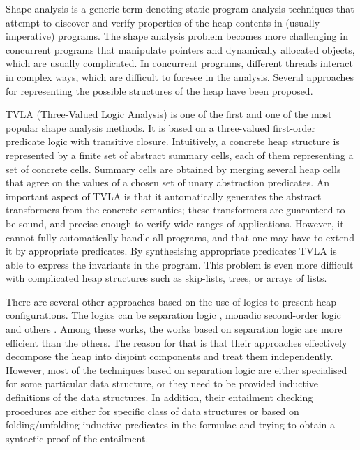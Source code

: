 Shape analysis is a generic term denoting static
program-analysis techniques that attempt to discover and verify properties of the heap contents in (usually imperative) programs. The shape analysis problem becomes more challenging in concurrent programs that manipulate pointers and dynamically allocated objects, which are usually complicated. 
In concurrent programs, different threads interact in complex ways, which are difficult to foresee in the analysis. Several approaches for representing the possible structures of the heap have been proposed.

TVLA (Three-Valued Logic Analysis) \cite{SagivRW02} is one of the first and one of the most popular shape analysis
methods. It is based on a three-valued first-order predicate logic with transitive closure. Intuitively, a concrete heap structure is represented by a finite set of abstract summary cells, each of them representing a set of concrete cells. Summary cells are obtained by merging several heap cells that agree on the values of a chosen set of unary abstraction predicates.  %
An important aspect of TVLA is that it automatically generates the abstract transformers from the concrete semantics; these transformers are guaranteed to be sound, and precise enough to verify wide ranges of applications. However, it cannot fully automatically handle all programs, and that one may have to extend it by appropriate predicates. By synthesising appropriate predicates TVLA is able to express the invariants in the program. This problem is even more difficult with complicated heap structures such as skip-lists, trees, or arrays of lists.  

There are several other approaches
 based on the use of logics to present heap configurations. The logics can be separation logic \cite{John:SL, Stephen:SL,JoshCris:SL,Hongseok:SL,Kamil:SL,Chin:SL,Quang:SL, Ruzica:SL, Constrantin:SL}, monadic second-order
 logic \cite{Ander:ML, Jakob:ML,Madhusudan:ML} and others \cite{Shmuel:Shape, Karen:Shape}. Among these works, the works based on separation logic are
  more efficient than the others. 
  The reason for that is that their approaches effectively decompose the heap into disjoint components and treat them independently. However, most of the techniques based on separation logic are either specialised for some particular data structure, or they need to be provided inductive definitions of the data structures. In addition, their entailment checking procedures are either for specific class of data structures or based on folding/unfolding inductive predicates in the formulae and trying to obtain a syntactic proof of the entailment. 

